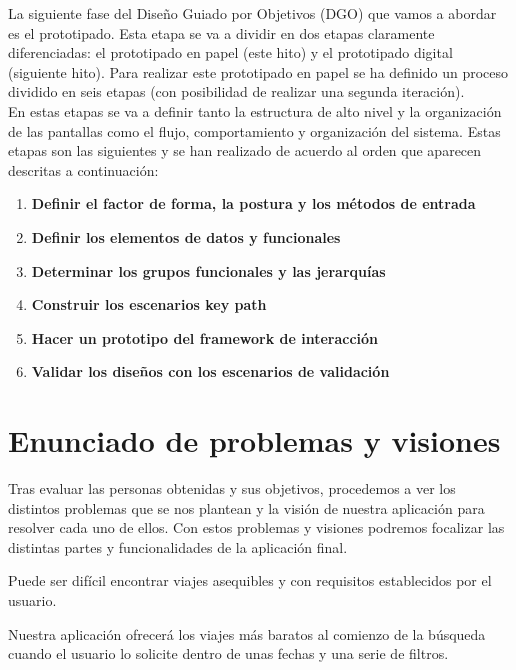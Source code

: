 
La siguiente fase del Diseño Guiado por Objetivos (DGO) que vamos a abordar es el prototipado. Esta etapa se va a dividir en dos etapas claramente diferenciadas:
el prototipado en papel (este hito) y el prototipado digital (siguiente hito). Para realizar este prototipado en papel se ha definido un proceso dividido en seis
etapas (con posibilidad de realizar una segunda iteración). \\

En estas etapas se va a definir tanto la estructura de alto nivel y la organización de las pantallas como el flujo, comportamiento y organización del sistema. Estas
etapas son las siguientes y se han realizado de acuerdo al orden que aparecen descritas a continuación:
\begin{enumerate}
    \item \textbf{Definir el factor de forma, la postura y los métodos de entrada}
    \item \textbf{Definir los elementos de datos y funcionales}
    \item \textbf{Determinar los grupos funcionales y las jerarquías}
    \item \textbf{Construir los escenarios key path}
    \item \textbf{Hacer un prototipo del framework de interacción}
    \item \textbf{Validar los diseños con los escenarios de validación}
\end{enumerate}

\section{Enunciado de problemas y visiones}

Tras evaluar las personas obtenidas y sus objetivos, procedemos a ver los distintos problemas que se nos plantean y la visión de nuestra aplicación para resolver cada uno de ellos. Con estos problemas y visiones podremos focalizar las distintas partes y funcionalidades de la aplicación final.

\begin{problema}

    Puede ser difícil encontrar viajes asequibles y con requisitos establecidos por el usuario.

    {\centering
    \begin{vision} \justifying \noindent
        Nuestra aplicación ofrecerá los viajes más baratos al comienzo de la búsqueda cuando el usuario lo solicite dentro de unas fechas y una serie de filtros.

    \end{vision}}
\end{problema}

